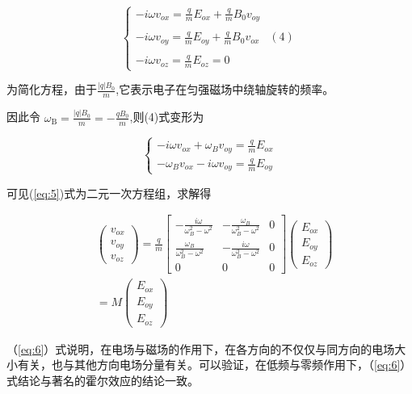 \documentclass[12pt]{ctexart}
\numberwithin{equation}{section} %
\begin{document}
\begin{equation}\begin{cases}-i\omega v_{ox}=\frac{q}{m}E_{ox}+\frac{q}{m}B_{0}v_{oy}\\\\-i\omega v_{oy}=\frac{q}{m}E_{oy}+\frac{q}{m}B_{0}v_{ox}&(4)\\\\-i\omega v_{oz}=\frac{q}{m}E_{oz}=0\end{cases}\end{equation}

为简化方程，由于$\frac{|q|B_0}m$,它表示电子在匀强磁场中绕轴旋转的频率。

因此令 $\omega_{\mathrm{B}}=\frac{|q|B_{0}}{m}=-\frac{qB_{0}}{m}$,则(4)式变形为


\begin{equation}
    \begin{cases}
-i\omega v_{ox}+\omega_{B}v_{oy}=\frac{q}{m}E_{ox}\\-\omega_{B}v_{ox}-i\omega v_{oy}=\frac{q}{m}E_{oy}
\end{cases}
\label{eq:5}
\end{equation}
\par 可见(\ref{eq:5})式为二元一次方程\cite{毛文炜2015光学工程基础}组，求解得


\begin{equation}
\begin{aligned}
   & \left(\begin{array}{c}v_{ox}\\v_{oy}\\v_{oz}\end{array}\right) = \frac{q}{m}
   \left[\begin{array}{ccc}
       -\frac{i\omega}{\omega_{B}^{2}-\omega^{2}} & -\frac{\omega_{B}}{\omega_{B}^{2}-\omega^{2}} & 0 \\
       \frac{\omega_{B}}{\omega_{B}^{2}-\omega^{2}} & -\frac{i\omega}{\omega_{B}^{2}-\omega^{2}} & 0 \\
       0 & 0 & 0
   \end{array}\right]
   \left(\begin{array}{c}E_{ox}\\ E_{oy}\\ E_{oz}\end{array}\right) \\
   &= M \left(\begin{array}{c}E_{ox}\\ E_{oy}\\ E_{oz}\end{array}\right)
   \label{eq:6}
\end{aligned}
\end{equation}
\par （\ref{eq:6}）式说明，在电场与磁场的作用下，在各方向的不仅仅与同方向的电场大小有关，也与其他方向电场分量有关。可以验证，在低频与零频作用下，（\ref{eq:6}）式结论与著名的霍尔效应的结论一致。
\end{document}
